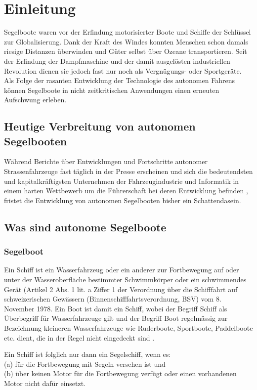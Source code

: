\chapter{Einleitung }
\label{chap:einleitung}
Segelboote waren vor der Erfindung motorisierter Boote und Schiffe der Schlüssel zur Globalisierung. Dank der Kraft des Windes konnten Menschen schon damals riesige Distanzen überwinden und Güter selbst über Ozeane transportieren. Seit der Erfindung der Dampfmaschine und der damit ausgelösten industriellen Revolution dienen sie jedoch fast nur noch als Vergnügungs- oder Sportgeräte. Als Folge der rasanten Entwicklung der Technologie des autonomen Fahrens können Segelboote in nicht zeitkritischen Anwendungen einen erneuten Aufschwung erleben.

\section{Heutige Verbreitung von autonomen Segelbooten}
Während Berichte über Entwicklungen und Fortschritte autonomer Strassenfahrzeuge fast täglich in der Presse erscheinen und sich die bedeutendsten und kapitalkräftigsten Unternehmen der Fahrzeugindustrie und Informatik in einem harten Wettbewerb um die Führerschaft bei deren Entwicklung befinden \cite{noauthor_autonomes_2023}, fristet die Entwicklung von autonomen Segelbooten bisher ein Schattendasein. 

\section{Was sind autonome Segelboote}
\subsection{Segelboot}
Ein Schiff ist ein Wasserfahrzeug oder ein anderer zur Fortbewegung auf oder unter der Wasseroberfläche bestimmter Schwimmkörper oder ein schwimmendes Gerät (Artikel 2 Abs. 1 lit. a Ziffer 1 der Verordnung über die Schifffahrt auf schweizerischen Gewässern (Binnenschifffahrtsverordnung, BSV) vom 8. November 1978. Ein Boot ist damit ein Schiff, wobei der Begriff Schiff als Überbegriff für Wasserfahrzeuge gilt und der Begriff Boot regelmässig zur Bezeichnung kleineren Wasserfahrzeuge wie Ruderboote, Sportboote, Paddelboote etc. dient, die in der Regel nicht eingedeckt sind \cite{noauthor_boot_2023}. 


Ein Schiff ist folglich nur dann ein Segelschiff, wenn es:\\
(a) für die Fortbewegung mit Segeln versehen ist und\\
(b) über keinen Motor für die Fortbewegung verfügt oder einen vorhandenen Motor nicht dafür einsetzt. 

